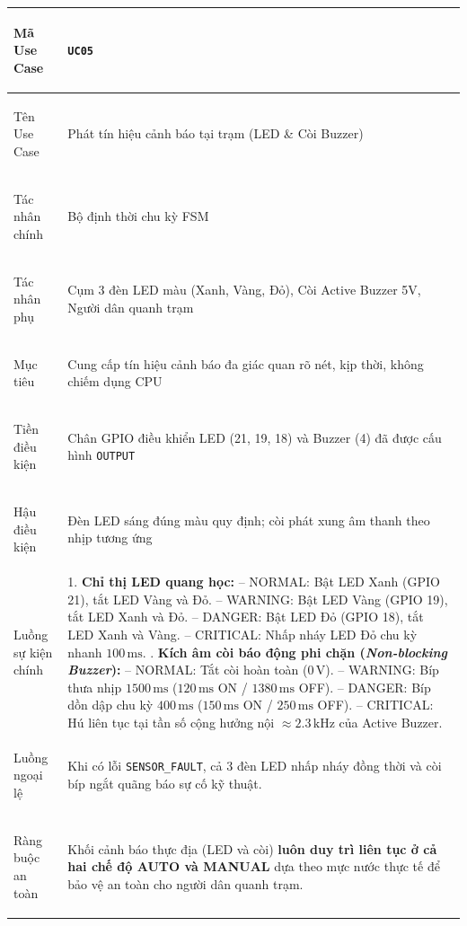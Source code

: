 \begin{xltabular}{\textwidth}{|>{\bfseries\raggedright\arraybackslash}p{3.2cm}|X|}
\hline
\endlastfoot
Mã Use Case & \texttt{UC05} \\ \hline
Tên Use Case & Phát tín hiệu cảnh báo tại trạm (LED \& Còi Buzzer) \\ \hline
Tác nhân chính & Bộ định thời chu kỳ FSM \\ \hline
Tác nhân phụ & Cụm 3 đèn LED màu (Xanh, Vàng, Đỏ), Còi Active Buzzer 5V, Người dân quanh trạm \\ \hline
Mục tiêu & Cung cấp tín hiệu cảnh báo đa giác quan rõ nét, kịp thời, không chiếm dụng CPU \\ \hline
Tiền điều kiện & Chân GPIO điều khiển LED (21, 19, 18) và Buzzer (4) đã được cấu hình \texttt{OUTPUT} \\ \hline
Hậu điều kiện & Đèn LED sáng đúng màu quy định; còi phát xung âm thanh theo nhịp tương ứng \\ \hline
Luồng sự kiện chính & 
1. \textbf{Chỉ thị LED quang học:} \newline
   -- NORMAL: Bật LED Xanh (GPIO 21), tắt LED Vàng và Đỏ. \newline
   -- WARNING: Bật LED Vàng (GPIO 19), tắt LED Xanh và Đỏ. \newline
   -- DANGER: Bật LED Đỏ (GPIO 18), tắt LED Xanh và Vàng. \newline
   -- CRITICAL: Nhấp nháy LED Đỏ chu kỳ nhanh $100\,\text{ms}$. . \textbf{Kích âm còi báo động phi chặn (\textit{Non-blocking Buzzer}):} \newline
   -- NORMAL: Tắt còi hoàn toàn ($0\,\text{V}$). \newline
   -- WARNING: Bíp thưa nhịp $1500\,\text{ms}$ ($120\,\text{ms}$ ON / $1380\,\text{ms}$ OFF). \newline
   -- DANGER: Bíp dồn dập chu kỳ $400\,\text{ms}$ ($150\,\text{ms}$ ON / $250\,\text{ms}$ OFF). \newline
   -- CRITICAL: Hú liên tục tại tần số cộng hưởng nội $\approx 2.3\,\text{kHz}$ của Active Buzzer. \\ \hline
Luồng ngoại lệ & Khi có lỗi \texttt{SENSOR\_FAULT}, cả 3 đèn LED nhấp nháy đồng thời và còi bíp ngắt quãng báo sự cố kỹ thuật. \\ \hline
Ràng buộc an toàn & Khối cảnh báo thực địa (LED và còi) \textbf{luôn duy trì liên tục ở cả hai chế độ AUTO và MANUAL} dựa theo mực nước thực tế để bảo vệ an toàn cho người dân quanh trạm. \\ \hline

\end{xltabular}
\endgroup

